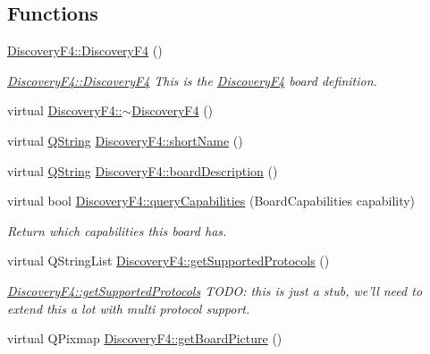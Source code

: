 \subsection*{\-Functions}
\begin{DoxyCompactItemize}
\item 
\hyperlink{group___boards___stm_gac87884749e97c313a7ae0f297c4fea34}{\-Discovery\-F4\-::\-Discovery\-F4} ()
\begin{DoxyCompactList}\small\item\em \hyperlink{group___boards___stm_gac87884749e97c313a7ae0f297c4fea34}{\-Discovery\-F4\-::\-Discovery\-F4} \-This is the \hyperlink{class_discovery_f4}{\-Discovery\-F4} board definition. \end{DoxyCompactList}\item 
virtual \hyperlink{group___boards___stm_ga9efdcb4c04776b36e256d689941943ea}{\-Discovery\-F4\-::$\sim$\-Discovery\-F4} ()
\item 
virtual \hyperlink{group___u_a_v_objects_plugin_gab9d252f49c333c94a72f97ce3105a32d}{\-Q\-String} \hyperlink{group___boards___stm_ga5c9636450b313e75d14d0277542ca1b7}{\-Discovery\-F4\-::short\-Name} ()
\item 
virtual \hyperlink{group___u_a_v_objects_plugin_gab9d252f49c333c94a72f97ce3105a32d}{\-Q\-String} \hyperlink{group___boards___stm_gaaa661c5a3b6c7fe84f8736ce1c090860}{\-Discovery\-F4\-::board\-Description} ()
\item 
virtual bool \hyperlink{group___boards___stm_ga81561678eef8f622b3cfe9f7af2aa762}{\-Discovery\-F4\-::query\-Capabilities} (\-Board\-Capabilities capability)
\begin{DoxyCompactList}\small\item\em \-Return which capabilities this board has. \end{DoxyCompactList}\item 
virtual \-Q\-String\-List \hyperlink{group___boards___stm_ga1db1bd4a572120a9b4224f4eb643ef2f}{\-Discovery\-F4\-::get\-Supported\-Protocols} ()
\begin{DoxyCompactList}\small\item\em \hyperlink{group___boards___stm_ga1db1bd4a572120a9b4224f4eb643ef2f}{\-Discovery\-F4\-::get\-Supported\-Protocols} \-T\-O\-D\-O\-: this is just a stub, we'll need to extend this a lot with multi protocol support. \end{DoxyCompactList}\item 
virtual \-Q\-Pixmap \hyperlink{group___boards___stm_gaec756cbf9ef744354fcb5eb274ba2b94}{\-Discovery\-F4\-::get\-Board\-Picture} ()

\end{DoxyCompactItemize}
